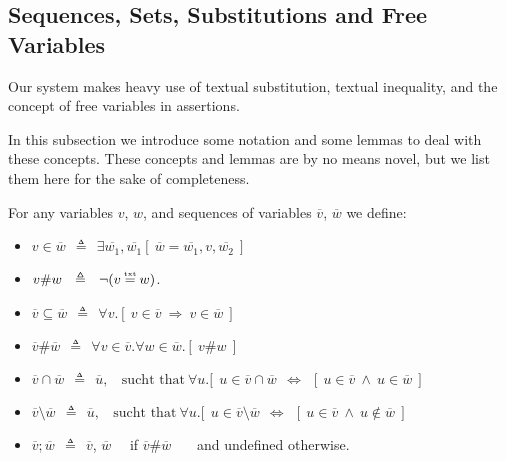 \newcommand{\Ao}{A_{o}}
\newcommand{\Ain}{A_{in}}
\newcommand{\Aout}{A_{out}}

\subsection{Sequences, Sets, Substitutions and Free Variables}


Our system makes heavy use of textual substitution,   textual inequality, and the concept of free variables in assertions. 
 
In this subsection we introduce some notation and some lemmas to deal with these concepts.
These concepts and lemmas are by no means novel, but we list them here for the sake of completeness.


\begin{definition}
For any variables $v$, $w$, and sequences of variables $\overline v$, $\overline w$ we define:
\begin{itemize}
\item
 $v \in \overline w \ \ \triangleq \ \  \exists  \overline {w_1},  \overline {w_1}[\  {\overline w} = \overline {w_1}, v, \overline {w_2} \ ]$
\item
$v \# w \ \ \triangleq \ \ \neg(v \txteq w)$.
\item
$\overline v \subseteq \overline w \ \ \triangleq \ \ \forall v.[\ v \in  \overline v\ \Rightarrow\ v \in  \overline w\ ]$
\item
$\overline v \#  \overline w \ \ \triangleq \ \ \forall v \in  \overline v. \forall w \in  \overline w.  [ \ v \# w\  ]$
\item
$ \overline v \cap \overline w \ \ \triangleq \ \  \overline u, \ \ \ \ \mbox{sucht that}\   \forall u.[ \ \ u  \in   \overline v \cap \overline w \ \ \Leftrightarrow\ \  [ \ u\in \overline v\ \wedge\ u\in \overline w\  ]$
\item
$ \overline v \setminus \overline w \ \ \triangleq \ \  \overline u, \ \ \ \ \mbox{sucht that}\   \forall u.[ \ \ u  \in  \overline v \setminus \overline w \ \ \Leftrightarrow\ \  [ \ u\in \overline v\ \wedge\ u\notin \overline w\  ]$
\item
$\overline v; \overline w \ \ \triangleq \ \ \overline v$, $\overline w$ \ \ if $\overline v \#  \overline w $ \ \ \ and  undefined otherwise.
\end{itemize}
\end{definition}

